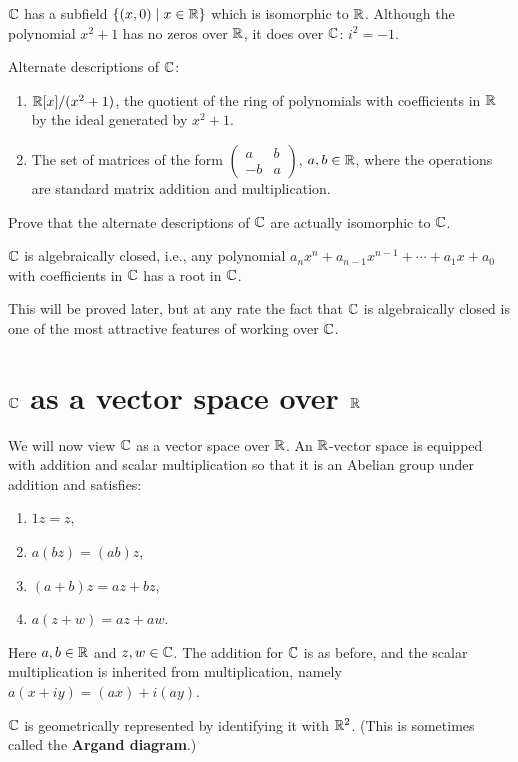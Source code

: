 $\mathbb C$ has a subfield $\{(x,0)\mid x\in\mathbb R\}$ which is isomorphic to $\mathbb R$. Although the polynomial $x^2+1$ has no zeros over $\mathbb R$, it does over $\mathbb C$: $i^2=-1$.

Alternate descriptions of $\mathbb C$:
\begin{enumerate}
\item $\mathbb R[x]/(x^2+1)$, the quotient of the ring of polynomials with coefficients in $\mathbb R$ by the ideal generated by $x^2+1$.
\item The set of matrices of the form $\begin{pmatrix}a&b\\-b&a\end{pmatrix}$, $a,b\in\mathbb R$, where the operations are standard matrix addition and multiplication.
\end{enumerate}

\begin{exercise}
Prove that the alternate descriptions of $\mathbb C$ are actually isomorphic to $\mathbb C$.
\end{exercise}

\begin{theorem}
$\mathbb C$ is algebraically closed, i.e., any polynomial $a_nx^n+a_{n-1}x^{n-1}+\cdots+a_1x+a_0$ with coefficients in $\mathbb C$ has a root in $\mathbb C$.
\end{theorem}

This will be proved later, but at any rate the fact that $\mathbb C$ is algebraically closed is one of the most attractive features of working over $\mathbb C$.

\section{$\mathbb C$ as a vector space over $\mathbb R$}
We will now view $\mathbb C$ as a vector space over $\mathbb R$. An $\mathbb R$-vector space is equipped with addition and scalar multiplication so that it is an Abelian group under addition and satisfies:
\begin{enumerate}[label=(\arabic*)]
\item $1z=z$,
\item $a(bz)=(ab)z$,
\item $(a+b)z=az+bz$,
\item $a(z+w)=az+aw$.
\end{enumerate}
Here $a,b\in\mathbb R$ and $z,w\in\mathbb C$. The addition for $\mathbb C$ is as before, and the scalar multiplication is inherited from multiplication, namely $a(x+iy)=(ax)+i(ay)$.

$\mathbb C$ is geometrically represented by identifying it with $\mathbb R^2$. (This is sometimes called the
\textbf{Argand diagram}.)

